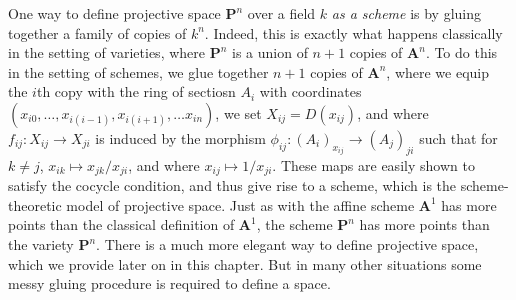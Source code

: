 \begin{example}
    One way to define projective space $\mathbf{P}^n$ over a field $k$ \emph{as a scheme} is by gluing together a family of copies of $k^n$. Indeed, this is exactly what happens classically in the setting of varieties, where $\mathbf{P}^n$ is a union of $n+1$ copies of $\mathbf{A}^n$. To do this in the setting of schemes, we glue together $n+1$ copies of $\mathbf{A}^n$, where we equip the $i$th copy with the ring of sectiosn $A_i$ with coordinates $(x_{i0}, \dots, x_{i(i-1)}, x_{i(i+1)}, \dots x_{in})$, we set $X_{ij} = D(x_{ij})$, and where $f_{ij}: X_{ij} \to X_{ji}$ is induced by the morphism $\phi_{ij}: (A_i)_{x_{ij}} \to (A_j)_{ji}$ such that for $k \neq j$, $x_{ik} \mapsto x_{jk} / x_{ji}$, and where $x_{ij} \mapsto 1/x_{ji}$. These maps are easily shown to satisfy the cocycle condition, and thus give rise to a scheme, which is the scheme-theoretic model of projective space.  Just as with the affine scheme $\mathbf{A}^1$ has more points than the classical definition of $\mathbf{A}^1$, the scheme $\mathbf{P}^n$ has more points than the variety $\mathbf{P}^n$. There is a much more elegant way to define projective space, which we provide later on in this chapter. But in many other situations some messy gluing procedure is required to define a space.
\end{example}

